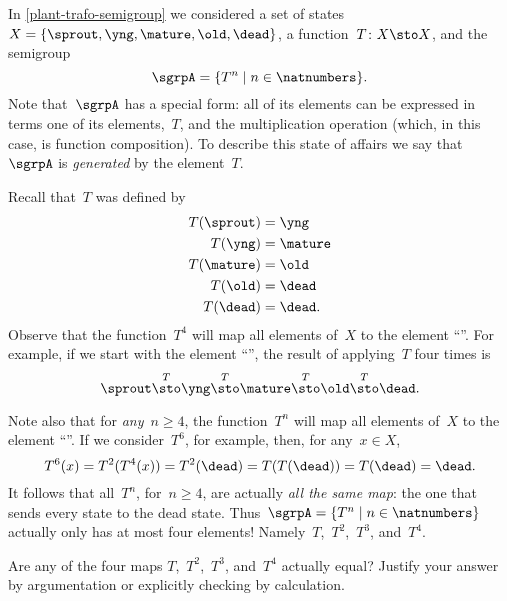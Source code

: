 

\section{}


In \cref{plant-trafo-semigroup} we considered a set of states~$X = \{ \sprout, \yng, \mature, \old, \dead \}$, a function~$T\colon X \sto X$, and the semigroup
\begin{equation}
\sgrpA = \{ T^n \mid n \in \natnumbers \}.
\end{equation}
Note that~$\sgrpA$ has a special form: all of its elements can be expressed in terms one of its elements,~$T$, and the multiplication operation (which, in this case, is function composition).
To describe this state of affairs we say that~$\sgrpA$ is \emph{generated} by the element~$T$.


Recall that~$T$ was defined by
\begin{align*}
T(\sprout) &=  \yng \\
T(\yng) &=  \mature \\
T(\mature) &=  \old \\
T( \old) &= \dead \\
T (\dead) &= \dead.
\end{align*}
Observe that the function~$T^4$ will map all elements of~$X$ to the element ``\dead''. For example, if we start with the element ``\sprout'', the result of applying~$T$ four times is
\begin{equation*}
\sprout \overset{T}{\sto} \yng \overset{T}{\sto} \mature \overset{T}{\sto} \old \overset{T}{\sto} \dead.
\end{equation*}

Note also that for \emph{any}~$n \geq 4$, the function~$T^n$ will map all elements of~$X$ to the element ``\dead''.
If we consider~$T^6$, for example, then, for any~$x \in X$,
\begin{equation*}
T^6(x) = T^2(T^4(x)) = T^2(\dead) = T(T(\dead)) = T(\dead) = \dead.
\end{equation*}
It follows that all~$T^n$, for~$n \geq 4$, are actually \emph{all the same map}: the one that sends every state to the dead state.
Thus~$\sgrpA = \{ T^n \mid n \in \natnumbers \}$ actually only has at most four elements! Namely~$T$,~$T^2$,~$T^3$, and~$T^4$.

\begin{exercise}
Are any of the four maps $T$,~$T^2$,~$T^3$, and~$T^4$ actually equal? Justify your answer by argumentation or explicitly checking by calculation. 
\end{exercise}

